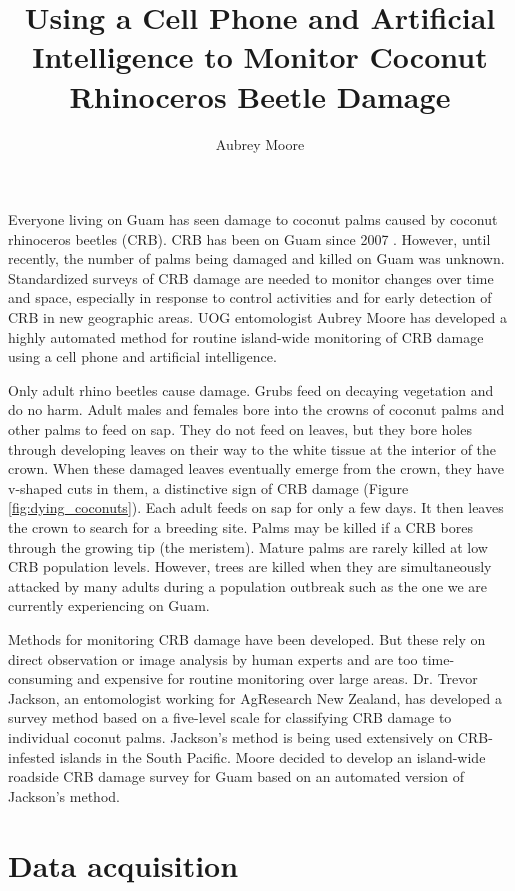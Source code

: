 \documentclass[letterpaper, 11pt]{scrartcl}
\title{Using a Cell Phone and Artificial Intelligence to Monitor Coconut Rhinoceros Beetle Damage}
\author{Aubrey Moore}
\begin{document}
\maketitle

Everyone living on Guam has seen damage to coconut palms caused by coconut rhinoceros beetles (CRB). CRB has been on Guam since 2007 \cite{moore2018}. However, until recently, the number of palms being damaged and killed on Guam was unknown. Standardized surveys of CRB damage are needed to monitor changes over time and space, especially in response to control activities and for early detection of CRB in new geographic areas. UOG entomologist Aubrey Moore has developed a highly automated method for routine island-wide monitoring of CRB damage using a cell phone and artificial intelligence.

Only adult rhino beetles cause damage. Grubs feed on decaying vegetation and do no harm. Adult males and females bore into the crowns of coconut palms and other palms to feed on sap. They do not feed on leaves, but they bore holes through developing leaves on their way to the white tissue at the interior of the crown. When these damaged leaves eventually emerge from the crown, they have v-shaped cuts in them, a distinctive sign of CRB damage (Figure \ref{fig:dying_coconuts}). Each adult feeds on sap for only a few days. It then leaves the crown to search for a breeding site. Palms may be killed if a CRB bores through the growing tip (the meristem). Mature palms are rarely killed at low CRB population levels. However, trees are killed when they are simultaneously attacked by many adults during a population outbreak such as the one we are currently experiencing on Guam.

Methods for monitoring CRB damage have been developed. But these rely on direct observation or image analysis by human experts and are too time-consuming and expensive for routine monitoring over large areas. Dr. Trevor Jackson, an entomologist working for AgResearch New Zealand, has developed a survey method based on a five-level scale for classifying CRB damage to individual coconut palms. Jackson's method is being used extensively on CRB-infested islands in the South Pacific. Moore decided to develop an island-wide roadside CRB damage survey for Guam based on an automated version of Jackson's method. 

\section*{Data acquisition} 
\end{document}
